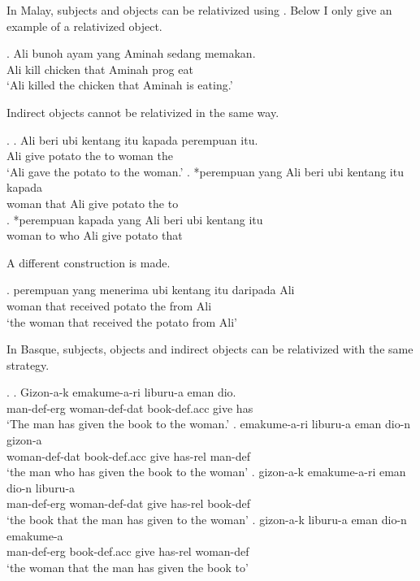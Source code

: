 In Malay, subjects and objects can be relativized using . Below I only give an example of a relativized object.

\exg. Ali bunoh ayam yang Aminah sedang memakan.\\
 Ali kill chicken that Aminah \ac{prog} eat\\
 `Ali killed the chicken that Aminah is eating.' 

Indirect objects cannot be relativized in the same way.

\ex.
\ag. Ali beri {ubi kentang} itu kapada perempuan itu.\\
 Ali give potato the to woman the\\
 `Ali gave the potato to the woman.'
\bg. *perempuan yang Ali beri {ubi kentang} itu kapada\\
 woman that Ali give potato the to\\
\bg. *perempuan kapada yang Ali beri {ubi kentang} itu\\
 woman to who Ali give potato that\\ 

A different construction is made.

\exg. perempuan yang menerima {ubi kentang} itu daripada Ali\\
 woman that received potato the from Ali\\
 `the woman that received the potato from Ali'

In Basque, subjects, objects and indirect objects can be relativized with the same strategy.

\ex.
\ag. Gizon-a-k emakume-a-ri liburu-a eman dio.\\
 man-\ac{def}-\ac{erg} woman-\ac{def}-\ac{dat} book-\ac{def}.\ac{acc} give has\\
 `The man has given the book to the woman.'
\bg. emakume-a-ri liburu-a eman dio-n gizon-a\\
 woman-\ac{def}-\ac{dat} book-\ac{def}.\ac{acc} give has-\ac{rel} man-\ac{def}\\
 `the man who has given the book to the woman'
\bg. gizon-a-k emakume-a-ri eman dio-n liburu-a\\
 man-\ac{def}-\ac{erg} woman-\ac{def}-\ac{dat} give has-\ac{rel} book-\ac{def}\\
 `the book that the man has given to the woman'
\bg. gizon-a-k liburu-a eman dio-n emakume-a\\
 man-\ac{def}-\ac{erg} book-\ac{def}.\ac{acc} give has-\ac{rel} woman-\ac{def}\\
 `the woman that the man has given the book to' 




